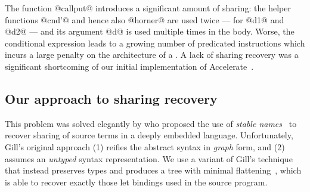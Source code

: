 The function @callput@ introduces a significant amount of sharing: the helper functions
@cnd'@ and hence also @horner@ are used twice --- for @d1@ and @d2@ --- and its
argument @d@ is used multiple times in the body. Worse, the conditional expression leads to a
growing number of predicated instructions which incurs a large penalty on the \SIMD architecture of
a \GPU\@. A lack of sharing recovery was a significant shortcoming of our initial implementation of
Accelerate~\cite{Chakravarty:2011fr}.

%


\subsection{Our approach to sharing recovery}

This problem was solved elegantly by \citet{Gill:2009dx} who proposed the use
of \emph{stable names}~\cite{PeytonJones:2000ks} to recover
sharing of source terms in a deeply embedded language. Unfortunately, Gill's
original approach (1) reifies the abstract syntax in \emph{graph} form, and (2)
assumes an \emph{untyped} syntax representation. We use a variant of Gill's
technique that instead preserves types and produces a tree with minimal
flattening~\cite{McDonell:2013wi}, which is able to recover exactly those let
bindings used in the source program.

